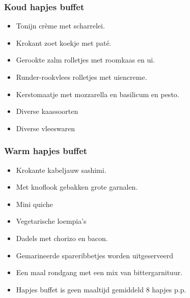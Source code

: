 \subsubsection{Koud hapjes buffet}
\begin{itemize}
	\item Tonijn crème met scharrelei.
	\item Krokant zoet koekje met paté.
	\item Gerookte zalm rolletjes met roomkaas en ui.
	\item Runder-rookvlees rolletjes met uiencreme.
	\item Kerstomaatje met mozzarella en basilicum en pesto.
	\item Diverse kaassoorten
	\item Diverse vleeswaren
\end{itemize}
\subsubsection{Warm hapjes buffet}

\begin{itemize}
	\item Krokante kabeljauw sashimi.
	\item Met knoflook gebakken grote garnalen.
	\item Mini quiche
	\item Vegetarische loempia's
	\item Dadels met chorizo en bacon.
	\item Gemarineerde spareribbetjes worden uitgeserveerd
	\item Een maal rondgang met een mix van bittergarnituur.
	\item Hapjes buffet is geen maaltijd gemiddeld 8 hapjes p.p.
\end{itemize}
